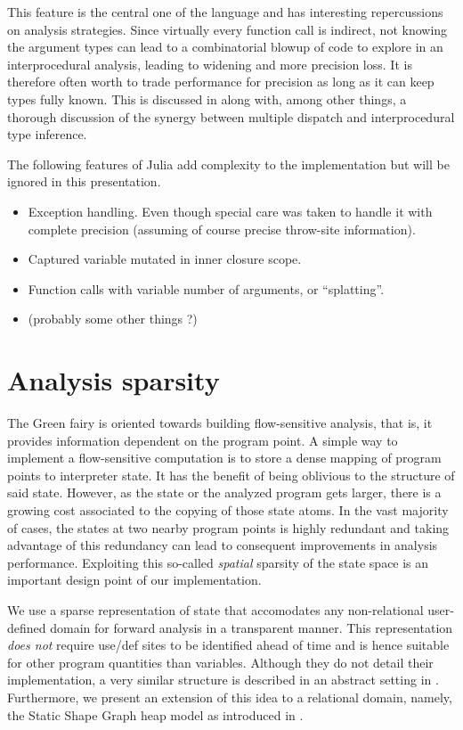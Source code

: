 \documentclass[11pt]{article}
\begin{document}
This feature is the central one of the language and has interesting repercussions on analysis strategies. Since virtually every function call is indirect, not knowing the argument types can lead to a combinatorial blowup of code to explore in an interprocedural analysis, leading to widening and more precision loss. It is therefore often worth to trade performance for precision as long as it can keep types fully known. This is discussed in \cite{jeff-phd} along with, among other things, a thorough discussion of the synergy between multiple dispatch and interprocedural type inference.

The following features of Julia add complexity to the implementation but will be ignored in this presentation.
\begin{itemize}
\item Exception handling. Even though special care was taken to handle it with complete precision (assuming of course precise throw-site information).
\item Captured variable mutated in inner closure scope.
\item Function calls with variable number of arguments, or ``splatting''.
\item (probably some other things ?)
\end{itemize}


\section*{Analysis sparsity}

The Green fairy is oriented towards building flow-sensitive analysis, that is, it provides information dependent on the program point.
A simple way to implement a flow-sensitive computation is to store a dense mapping of program points to interpreter state. It has the benefit of being oblivious to the structure of said state.
However, as the state or the analyzed program gets larger, there is a growing cost associated to the copying of those state atoms.
In the vast majority of cases, the states at two nearby program points is highly redundant and taking advantage of this redundancy can lead to consequent improvements in analysis performance. Exploiting this so-called \emph{spatial} sparsity of the state space is an important design point of our implementation.

We use a sparse representation of state that accomodates any non-relational user-defined domain for forward analysis in a transparent manner.
This representation \emph{does not} require use/def sites to be identified ahead of time and is hence suitable for other program quantities than variables.
Although they do not detail their implementation, a very similar structure is described in an abstract setting in \cite{sparse-nr}.
Furthermore, we present an extension of this idea to a relational domain, namely, the Static Shape Graph heap model as introduced in \cite{ssc}.
\end{document}
